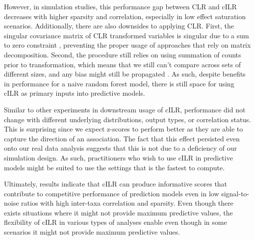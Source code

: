 \documentclass[10pt,letterpaper]{article}
\begin{document}
However, in simulation studies, this performance gap between CLR and cILR decreases with higher sparsity and correlation, especially in low effect saturation scenarios. Additionally, there are also downsides to applying CLR. First, the singular covariance matrix of CLR transformed variables is singular due to a sum to zero constraint \cite{gloor2017}, preventing the proper usage of approaches that rely on matrix decomposition. Second, the procedure still relies on using summation of counts prior to transformation, which means that we still can't compare across sets of different sizes, and any bias might still be propagated \cite{mclaren2019}. As such, despite benefits in performance for a naive random forest model, there is still space for using cILR as primary inputs into predictive models. 

Similar to other experiments in downstream usage of cILR, performance did not change with different underlying distributions, output types, or correlation status. This is surprising since we expect z-scores to perform better as they are able to capture the direction of an association. The fact that this effect persisted even onto our real data analysis suggests that this is not due to a deficiency of our simulation design. As such, practitioners who wish to use cILR in predictive models might be suited to use the settings that is the fastest to compute.  

Ultimately, results indicate that cILR can produce informative scores that contribute to competitive performance of prediction models even in low signal-to-noise ratios with high inter-taxa correlation and sparsity. Even though there exists situations where it might not provide maximum predictive values, the flexibility of cILR in various types of analyses enable even though in some scenarios it might not provide maximum predictive values. 
\end{document}
